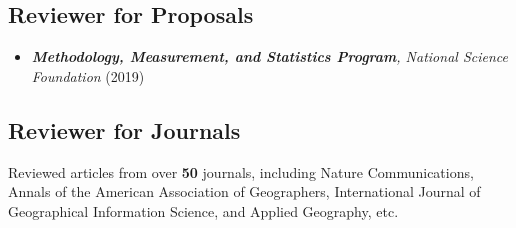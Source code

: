 \documentclass[11pt, a4paper]{article}
\begin{document}
\subsection*{Reviewer for Proposals}
\begin{itemize}
  \setlength\itemsep{0em}
  \item \emph{\textbf{Methodology, Measurement, and Statistics Program}, National Science Foundation} (2019)  
\end{itemize} 


\subsection*{Reviewer for Journals}
Reviewed articles from over \textbf{50} journals, including Nature Communications, Annals of the American Association of Geographers, International Journal of Geographical Information Science, and Applied Geography, etc.
\end{document}

